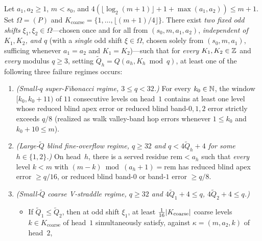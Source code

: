 \begin{theorem}\label{thm:A}
Let $a_1, a_2 \ge 1$, $m < s_0$, and $4(\lfloor \log_2(m+1) \rfloor + 1 + \max(a_1, a_2)) \le m + 1$. Set $\Omega =
{}$$(P)$ and $K_{\mathrm{coarse}} = \{1, \dots, \lfloor (m+1)/4 \rfloor\}$. There exist \emph{two fixed odd
shifts} $\xi_1, \xi_2 \in \Omega$---chosen once and for all from $(s_0, m, a_1, a_2)$, \emph{independent of $K_1, K_2$,
and $q$} (with a \emph{single} odd shift $\xi \in \Omega$, chosen solely from $(s_0, m, a_1)$, sufficing whenever $a_1 = a_2$
and $K_1 = K_2$)---such that for \emph{every} $K_1, K_2 \in \mathbb{Z}$ and \emph{every} modulus $q \ge 3$, setting $\tilde{Q}_h =
Q(a_h, K_h \bmod q)$, at least one of the following three failure regimes occurs:
\begin{enumerate}
\item \emph{(Small-$q$ super-Fibonacci regime, $3 \le q < 32$.)} For every $k_0 \in \mathbb{N}$, the window $[k_0, k_0 + 11)$ of
  $11$ consecutive levels on head~$1$ contains at least one level whose reduced blind apex error or reduced blind band-$0,
  1, 2$ error strictly exceeds $q / 8$ (realized as walk valley-band hop errors whenever $1 \le k_0$ and $k_0 + 10 \le m$).
\item \emph{(Large-$\tilde{Q}$ blind fine-overflow regime, $q \ge 32$ and $q < 4\tilde{Q}_h + 4$ for some $h \in \{1, 2\}$.)}
  On head~$h$, there is a served residue $\mathrm{rem} < a_h$ such that \emph{every} level $k < m$ with $(m - k) \bmod
  (a_h + 1) = \mathrm{rem}$ has reduced blind apex error $\ge q/16$, or reduced blind band-$0$ or band-$1$ error $\ge q/8$.
\item \emph{(Small-$\tilde{Q}$ coarse V-straddle regime, $q \ge 32$ and $4\tilde{Q}_1 + 4 \le q$, $4\tilde{Q}_2 + 4 \le q$.)}
  \begin{itemize}
  \item If $\tilde{Q}_1 \le \tilde{Q}_2$, then at odd shift $\xi_1$, at least $\tfrac{1}{16}\lvert K_{\mathrm{coarse}} \rvert$
    coarse levels $k \in K_{\mathrm{coarse}}$ of head~$1$ simultaneously satisfy, against $\kappa =
    {}$$(m, a_2, k)$ of head~$2$,

\end{itemize}
\end{enumerate}
\end{theorem}
